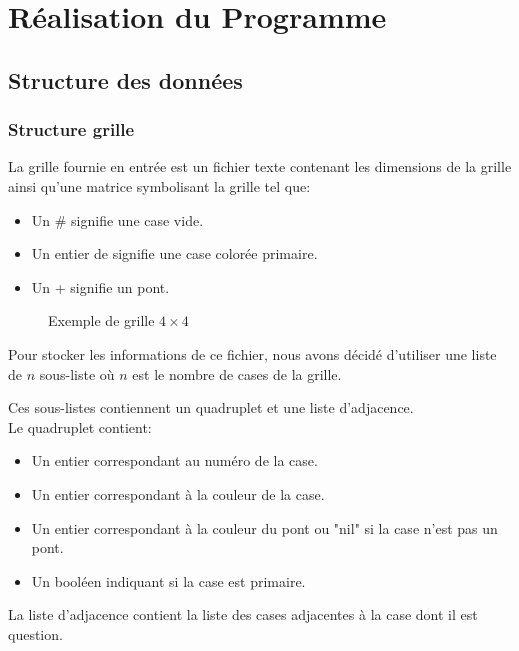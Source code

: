 \chapter{Réalisation du Programme}
\section{Structure des données}
\subsection{Structure grille}

La grille fournie en entrée est un fichier texte contenant les dimensions de la grille ainsi qu'une matrice symbolisant la grille tel que:
\begin{itemize}
	\item Un \# signifie une case vide.
    \item Un entier de signifie une case colorée primaire.
    \item Un + signifie un pont.
\end{itemize}

\begin{figure}[ht]
	\centering
	\theverbbox
	\caption{Exemple de grille $4\times 4$}
	\label{fig:ex_grille}
\end{figure}

Pour stocker les informations de ce fichier, nous avons décidé d'utiliser une liste de $n$ sous-liste où $n$ est le nombre de cases de la grille.

Ces sous-listes contiennent un quadruplet et une liste d'adjacence.\\

Le quadruplet contient:
\begin{itemize}
	\item Un entier correspondant au numéro de la case.
    \item Un entier correspondant à la couleur de la case.
    \item Un entier correspondant à la couleur du pont ou "nil" si la case n'est pas un pont.
    \item Un booléen indiquant si la case est primaire.
\end{itemize}

La liste d'adjacence contient la liste des cases adjacentes à la case dont il est question.\\

